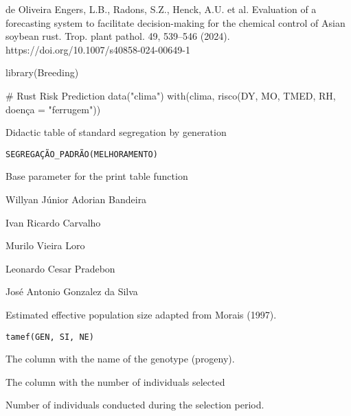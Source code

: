 \documentclass[a4paper]{book}
\begin{document}
%
\begin{References}
de Oliveira Engers, L.B., Radons, S.Z., Henck, A.U. et al.
Evaluation of a forecasting system to facilitate decision-making for the
chemical control of Asian soybean rust. Trop. plant pathol. 49, 539–546 (2024).
https://doi.org/10.1007/s40858-024-00649-1
\end{References}
%
\begin{Examples}
\begin{ExampleCode}

library(Breeding)

# Rust Risk Prediction
data("clima")
with(clima, risco(DY, MO, TMED, RH, doença = "ferrugem"))

\end{ExampleCode}
\end{Examples}
%
\begin{Description}
Didactic table of standard segregation by generation
\end{Description}
%
\begin{Usage}
\begin{verbatim}
SEGREGAÇÃO_PADRÃO(MELHORAMENTO)
\end{verbatim}
\end{Usage}
%
\begin{Arguments}
\begin{ldescription}
\item[\code{MELHORAMENTO}] Base parameter for the print table function
\end{ldescription}
\end{Arguments}
%
\begin{Author}
Willyan Júnior Adorian Bandeira

Ivan Ricardo Carvalho

Murilo Vieira Loro

Leonardo Cesar Pradebon

José Antonio Gonzalez da Silva
\end{Author}
%
\begin{Description}
Estimated effective population size adapted from Morais (1997).
\end{Description}
%
\begin{Usage}
\begin{verbatim}
tamef(GEN, SI, NE)
\end{verbatim}
\end{Usage}
%
\begin{Arguments}
\begin{ldescription}
\item[\code{GEN}] The column with the name of the genotype (progeny).

\item[\code{SI}] The column with the number of individuals selected

\item[\code{NE}] Number of individuals conducted during the selection period.
\end{ldescription}
\end{Arguments}
\end{document}
